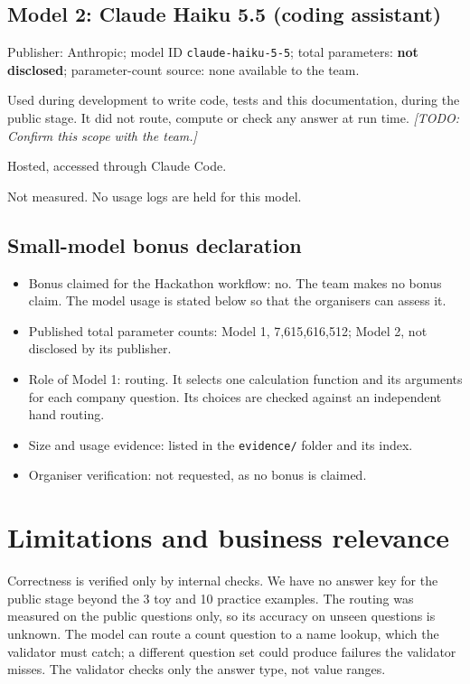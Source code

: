 \documentclass[11pt,a4paper]{article}
\newcommand{\todo}[1]{\textit{[TODO: #1]}}
\begin{document}
\subsection*{Model 2: Claude Haiku 5.5 (coding assistant)}
\begin{description}[style=nextline]
  \item[Identity and size] Publisher: Anthropic; model ID \texttt{claude-haiku-5-5};
    total parameters: \textbf{not disclosed}; parameter-count source: none
    available to the team.
  \item[Role and stage] Used during development to write code, tests and this
    documentation, during the public stage. It did not route, compute or check any answer
    at run time. \todo{Confirm this scope with the team.}
  \item[Configuration] Hosted, accessed through Claude Code.
  \item[Usage and evidence] Not measured. No usage logs are held for this model.
\end{description}

\subsection*{Small-model bonus declaration}
\begin{itemize}
  \item Bonus claimed for the Hackathon workflow: no. The team makes no bonus claim.
    The model usage is stated below so that the organisers can assess it.
  \item Published total parameter counts: Model 1, 7,615,616,512; Model 2, not
    disclosed by its publisher.
  \item Role of Model 1: routing. It selects one calculation function and its
    arguments for each company question. Its choices are checked against an
    independent hand routing.
  \item Size and usage evidence: listed in the \texttt{evidence/} folder and its index.
  \item Organiser verification: not requested, as no bonus is claimed.
\end{itemize}

\section{Limitations and business relevance}
Correctness is verified only by internal checks. We have no answer key for the public stage beyond the 3 toy and 10 practice examples. The routing was measured on the
public questions only, so its accuracy on unseen questions is unknown. The model
can route a count question to a name lookup, which the validator must catch; a
different question set could produce failures the validator misses. The
validator checks only the answer type, not value ranges.
\end{document}
